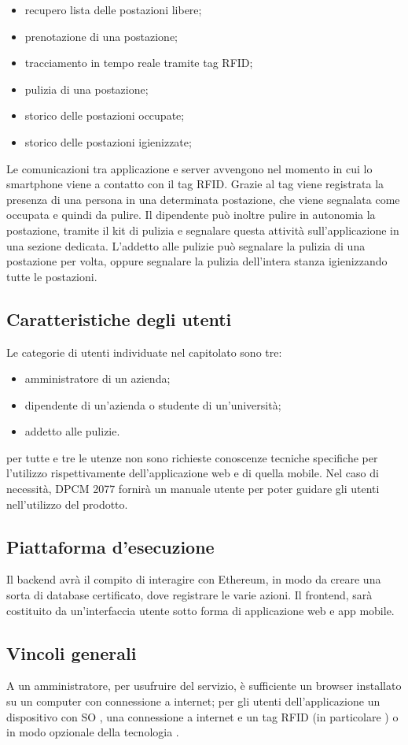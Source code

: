 \begin{itemize}
	\item recupero lista delle postazioni libere; \\
	\item prenotazione di una postazione; \\
	\item tracciamento in tempo reale tramite tag RFID; \\
	\item pulizia di una postazione; \\
	\item storico delle postazioni occupate; \\
	\item storico delle postazioni igienizzate; \\ 
\end{itemize}
Le comunicazioni tra applicazione e server avvengono nel momento in cui lo smartphone viene a contatto con il tag RFID. Grazie al tag viene registrata la presenza di una persona in una determinata postazione, che viene segnalata come occupata e quindi da pulire. Il dipendente può inoltre pulire in autonomia la postazione, tramite il kit di pulizia e segnalare questa attività sull’applicazione in una sezione dedicata.
L’addetto alle pulizie può segnalare la pulizia di una postazione per volta, oppure segnalare la pulizia dell’intera stanza igienizzando tutte le postazioni.

\subsection{Caratteristiche degli utenti}
Le categorie di utenti individuate nel capitolato sono tre:
\begin{itemize}
	\item amministratore di un azienda;
	\item dipendente di un'azienda o studente di un'università;
    \item addetto alle pulizie.
\end{itemize}
per tutte e tre le utenze non sono richieste conoscenze tecniche specifiche per l'utilizzo rispettivamente dell'applicazione web e di quella mobile. Nel caso di necessità, DPCM 2077 fornirà un manuale utente per poter guidare gli utenti nell'utilizzo del prodotto.
\subsection{Piattaforma d'esecuzione}
Il backend avrà il compito di interagire con Ethereum, in modo da creare una sorta di database certificato, dove registrare le varie azioni. Il frontend, sarà costituito da un'interfaccia utente sotto forma di applicazione web e app mobile. 
\subsection{Vincoli generali}
A un amministratore, per usufruire del servizio, è sufficiente un browser installato su un computer con connessione a internet; per gli utenti dell'applicazione un dispositivo con SO , una connessione a internet e un tag RFID (in particolare ) o in modo opzionale della tecnologia .


